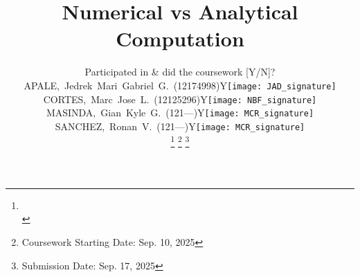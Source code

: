 




\title{Numerical vs Analytical Computation} %

\author{
	{\small
	\begin{tabular}{l l l}
    & \multicolumn{2}{c}{\tiny \textcolor[rgb]{0.9,0.9,0.9}{Participated in \& did the coursework [Y/N]?}} 
    \\ 
		APALE,~Jedrek~Mari~Gabriel~G.~(12174998) & Y & \texttt{[image: JAD\_signature]}
		\\ 
		CORTES,~Marc~Jose~L.~(12125296)     & Y & \texttt{[image: NBF\_signature]}
		\\ 
		MASINDA,~Gian~Kyle~G.~(121---)  & Y & \texttt{[image: MCR\_signature]}
		\\ 
        SANCHEZ,~Ronan~V.~(121---)  & Y & \texttt{[image: MCR\_signature]}
		\\ 
	\end{tabular}
	}
\thanks{\CrmD\protect\\} %
 \thanks{Coursework Starting Date: \hspace{1ex} Sep. 10, 2025}
\thanks{Submission Date: \hspace{1ex} Sep. 17, 2025}} 

%
{} %


